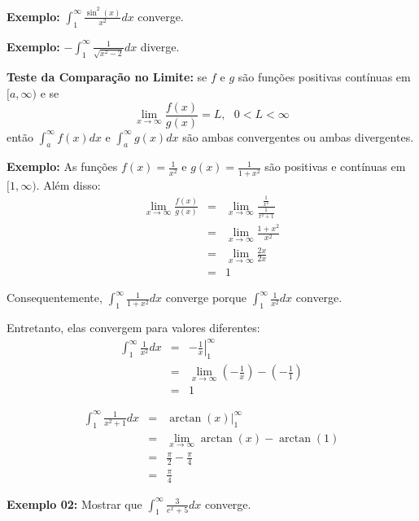 \documentclass[oneside,a4paper,12pt]{article}
\begin{document}
{\bf Exemplo:} $\int_{1}^{\infty}\frac{\sin^{2}(x)}{x^2}dx$ converge.

\vspace{200pt}

{\bf Exemplo:} $- \int_{1}^{\infty}\frac{1}{\sqrt{x^2 - 2}}dx$ diverge.

\vspace{300pt}

{\bf Teste da Comparação no Limite:} se $f$ e $g$ são funções positivas contínuas em $[a,\infty)$ e se
$$\lim\limits_{x \rightarrow \infty}\frac{f(x)}{g(x)} = L, \text{   } 0 < L < \infty$$
então $\int_{a}^{\infty}f(x)dx$ e $\int_{a}^{\infty}g(x)dx$ são ambas convergentes ou ambas divergentes.

{\bf Exemplo:} As funções $f(x) = \frac{1}{x^2}$ e $g(x) = \frac{1}{1 + x^2}$ são positivas e contínuas em $[1,\infty)$. Além disso:
\begin{eqnarray*}
\lim\limits_{x \rightarrow \infty}\frac{f(x)}{g(x)} & = & \lim\limits_{x \rightarrow \infty}\frac{\frac{1}{x^2}}{\frac{1}{x^2 + 1}} \\
& = & \lim\limits_{x \rightarrow \infty}\frac{1 + x^2}{x^2} \\
& = & \lim\limits_{x \rightarrow \infty}\frac{2x}{2x} \\
& = & 1
\end{eqnarray*}

Consequentemente, $\int_{1}^{\infty}\frac{1}{1+x^2}dx$ converge porque $\int_{1}^{\infty}\frac{1}{x^2}dx$ converge.

Entretanto, elas convergem para valores diferentes:
\begin{eqnarray*}
\int_{1}^{\infty}\frac{1}{x^2}dx & = & \left .-\frac{1}{x}\right|^{\infty}_{1} \\
& = & \lim\limits_{x \rightarrow \infty}\left( - \frac{1}{x} \right) - \left( - \frac{1}{1} \right) \\
& = & 1
\end{eqnarray*}

\begin{eqnarray*}
\int_{1}^{\infty}\frac{1}{x^2 + 1}dx & = & \arctan(x) |_{1}^{\infty} \\
& = & \lim\limits_{x \rightarrow \infty} \arctan(x) - \arctan(1) \\
& = & \frac{\pi}{2} - \frac{\pi}{4} \\
& = & \frac{\pi}{4}
\end{eqnarray*}

{\bf Exemplo 02:} Mostrar que $\int_{1}^{\infty}\frac{3}{e^x + 5}dx$ converge.
\end{document}

